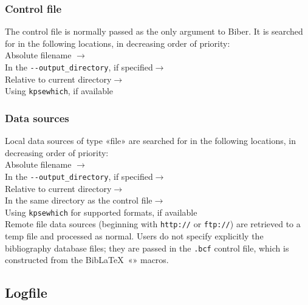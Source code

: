\documentclass{ltxdockit}
\begin{document}
\subsubsection{Control file}\label{loc:cf}

The control file is normally passed as the only argument to Biber. It is
searched for in the following locations, in decreasing order of
priority:\\[2ex]

\noindent Absolute filename $\rightarrow$\\
\hspace*{1em}In the \verb+--output_directory+, if specified$\rightarrow$\\
\hspace*{2em}Relative to current directory$\rightarrow$\\
\hspace*{3em}Using \verb+kpsewhich+, if available

\subsubsection{Data sources}

Local data sources of type «file» are searched for in the following
locations, in decreasing order of priority:\\[2ex]

\noindent Absolute filename $\rightarrow$\\
\hspace*{1em}In the \verb+--output_directory+, if specified$\rightarrow$\\
\hspace*{2em}Relative to current directory$\rightarrow$\\
\hspace*{3em}In the same directory as the control file$\rightarrow$\\
\hspace*{4em}Using \verb+kpsewhich+ for supported formats, if available\\[2ex]

\noindent Remote file data sources (beginning with \verb+http://+ or
\verb+ftp://+) are retrieved to a temp file and processed as normal. Users
do not specify explicitly the bibliography database files; they are passed
in the \verb+.bcf+ control file, which is constructed from the
Bib\LaTeX\ «\verb++» macros.

\subsection{Logfile}
\end{document}
